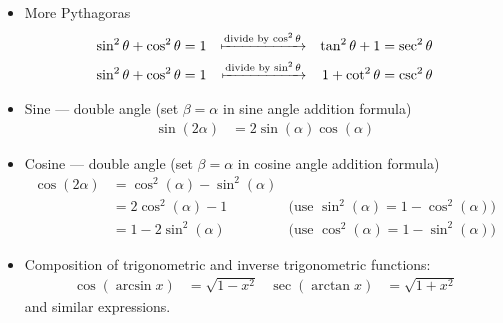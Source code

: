 \begin{itemize}
 \item More Pythagoras
\begin{align*}
\sin^2\theta + \cos^2 \theta &=1 & \xmapsto{\text{divide by $\cos^2\theta$}}&&
\tan^2\theta + 1  &= \sec^2\theta \\
\sin^2\theta + \cos^2 \theta &=1 & \xmapsto{\text{divide by $\sin^2\theta$}}&&
1 + \cot^2 \theta &=\csc^2\theta
\end{align*}

 \item Sine --- double angle (set $\beta =\alpha$ in sine angle addition formula)
\begin{align*}
  \sin(2\alpha) &= 2\sin(\alpha)\cos(\alpha)
\end{align*}
 \item Cosine --- double angle (set $\beta =\alpha$ in cosine angle addition formula)
\begin{align*}
  \cos(2\alpha) &= \cos^2(\alpha) - \sin^2(\alpha) \\
  &= 2\cos^2(\alpha) - 1  & \text{(use $\sin^2(\alpha)= 1-\cos^2(\alpha)$)}\\
  &= 1 - 2\sin^2(\alpha) & \text{(use $\cos^2(\alpha)= 1-\sin^2(\alpha)$)}
\end{align*}
\item Composition of trigonometric and inverse trigonometric functions:
\begin{align*}
  \cos( \arcsin x) &= \sqrt{1-x^2} &
  \sec( \arctan x) &= \sqrt{1+x^2}
\end{align*}
and similar expressions.
\end{itemize}



